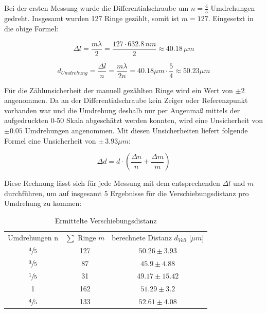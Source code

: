 \documentclass[
  headings=optiontotocandhead,
  twoside,
  openright,
  numbers=noenddot,
  toc=flat,
  11pt,
  parskip=full,
  listof=flat,
  bibliography=totoc,
  a4paper,
  DIV=14,
  BCOR=22mm,
  headheight=5mm,
  headinclude=true,
]{scrartcl}
\begin{document}
Bei der ersten Messung wurde die Differentialschraube um $n = \frac{4}{5}$ Umdrehungen gedreht. Insgesamt wurden 127 Ringe gezählt, somit ist $m = 127$. Eingesetzt in die obige Formel:

\begin{equation}
 \Delta l = \frac{m \lambda}{2} = \frac{127 \cdot 632.8 \, nm} {2} \approx 40.18\, \mu m
\label{eq:4.1.2}
\end{equation}

\begin{equation}
\label{eq:4.1.a}
d_{Umdrehung}=\frac{\Delta l}{n} = \frac{m \lambda}{2 n}= 40.18 \mu m \cdot \frac{5}{4} \approx 50.23 \mu m
\end{equation}

Für die Zählunsicherheit der manuell gezählten Ringe wird ein Wert von $\pm 2$ angenommen. Da an der Differentialschraube kein Zeiger oder Referenzpunkt vorhanden war und die Umdrehung deshalb nur per Augenmaß mittels der aufgedruckten 0-50 Skala abgeschätzt werden konnten, wird eine Unsicherheit von $\pm 0.05$ Umdrehungen angenommen. Mit diesen Unsicherheiten liefert folgende Formel eine Unsicherheit von $\pm  \, 3.93\mu m$:

\begin{equation}
\label{eq:4.1.3}
\Delta d = d \cdot \left( \frac{\Delta n }{n} + \frac{\Delta m}{m} \right)
\end{equation}

Diese Rechnung lässt sich für jede Messung mit dem entsprechenden $\Delta l$ und $m$ durchführen, um auf insgesamt 5 Ergebnisse für die Verschiebungsdistanz pro Umdrehung zu kommen:

\begin{table}[htbp]
\centering
\setlength{\tabcolsep}{10pt}
\begin{tabular}{ |c|c|c| }
  \multicolumn{1}{c}{Umdrehungen n} & \multicolumn{1}{c}{$\sum$ Ringe $m$} & \multicolumn{1}{c}{berechnete Distanz $d_{Voll}$ [$\mu m$]} \\
  $\sfrac{4}{5}$ & 127 & $ 50.26\pm 3.93$ \\
  $\sfrac{3}{5}$ & 87 & $ 45.9\pm 4.88$ \\
  $\sfrac{1}{5}$ & 31 & $ 49.17\pm 15.42$ \\
  1 & 162 & $ 51.29\pm 3.2$ \\
  $\sfrac{4}{5}$ & 133 & $ 52.61 \pm 4.08$ \\
\end{tabular}
\caption{Ermittelte Verschiebungsdistanz}
\label{tab:wellenlängeberechnet}
\end{table}
\end{document}
